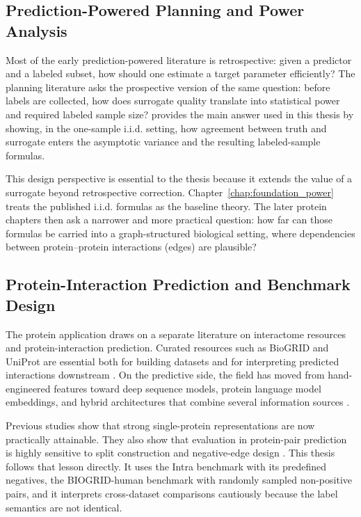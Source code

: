 \subsection[Power and Planning]{Prediction-Powered Planning and Power Analysis}

Most of the early prediction-powered literature is retrospective: given a predictor and a labeled subset, how should one estimate a target parameter efficiently? The planning literature asks the prospective version of the same question: before labels are collected, how does surrogate quality translate into statistical power and required labeled sample size? \textcite{ppi_power} provides the main answer used in this thesis by showing, in the one-sample i.i.d. setting, how agreement between truth and surrogate enters the asymptotic variance and the resulting labeled-sample formulas.

This design perspective is essential to the thesis because it extends the value of a surrogate beyond retrospective correction. Chapter~\ref{chap:foundation_power} treats the published i.i.d. formulas as the baseline theory. The later protein chapters then ask a narrower and more practical question: how far can those formulas be carried into a graph-structured biological setting, where dependencies between protein--protein interactions (edges) are plausible?

\subsection[Protein-Interaction Prediction]{Protein-Interaction Prediction and Benchmark Design}

The protein application draws on a separate literature on interactome resources and protein-interaction prediction. Curated resources such as BioGRID and UniProt are essential both for building datasets and for interpreting predicted interactions downstream \parencite{biogrid2019, uniprot2025}. On the predictive side, the field has moved from hand-engineered features toward deep sequence models, protein language model embeddings, and hybrid architectures that combine several information sources \parencite{sun2017, dscript2021, prottrans2022, lin2023, lee2023}.

Previous studies show that strong single-protein representations are now practically attainable. They also show that evaluation in protein-pair prediction is highly sensitive to split construction and negative-edge design \parencite{park2012, bernett2024}. This thesis follows that lesson directly. It uses the Intra benchmark with its predefined negatives, the BIOGRID-human benchmark with randomly sampled non-positive pairs, and it interprets cross-dataset comparisons cautiously because the label semantics are not identical.

